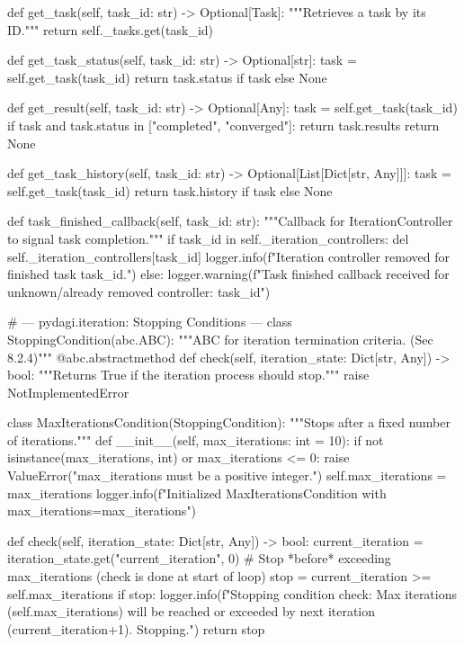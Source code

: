 \documentclass{amsbook}
\theoremstyle{definition}
\theoremstyle{remark}
\numberwithin{equation}{chapter} %
\begin{document}
\begin{python}
    def get_task(self, task_id: str) -> Optional[Task]:
        """Retrieves a task by its ID."""
        return self._tasks.get(task_id)

    def get_task_status(self, task_id: str) -> Optional[str]:
        task = self.get_task(task_id)
        return task.status if task else None

    def get_result(self, task_id: str) -> Optional[Any]:
        task = self.get_task(task_id)
        if task and task.status in ["completed", "converged"]:
            return task.results
        return None

    def get_task_history(self, task_id: str) -> Optional[List[Dict[str, Any]]]:
         task = self.get_task(task_id)
         return task.history if task else None

    def task_finished_callback(self, task_id: str):
         """Callback for IterationController to signal task completion."""
         if task_id in self._iteration_controllers:
              del self._iteration_controllers[task_id]
              logger.info(f"Iteration controller removed for finished task {task_id}.")
         else:
              logger.warning(f"Task finished callback received for unknown/already removed controller: {task_id}")


# --- pydagi.iteration: Stopping Conditions ---
class StoppingCondition(abc.ABC):
    """ABC for iteration termination criteria. (Sec 8.2.4)"""
    @abc.abstractmethod
    def check(self, iteration_state: Dict[str, Any]) -> bool:
        """Returns True if the iteration process should stop."""
        raise NotImplementedError

class MaxIterationsCondition(StoppingCondition):
    """Stops after a fixed number of iterations."""
    def __init__(self, max_iterations: int = 10):
        if not isinstance(max_iterations, int) or max_iterations <= 0:
             raise ValueError("max_iterations must be a positive integer.")
        self.max_iterations = max_iterations
        logger.info(f"Initialized MaxIterationsCondition with max_iterations={max_iterations}")

    def check(self, iteration_state: Dict[str, Any]) -> bool:
        current_iteration = iteration_state.get("current_iteration", 0)
        # Stop *before* exceeding max_iterations (check is done at start of loop)
        stop = current_iteration >= self.max_iterations
        if stop:
             logger.info(f"Stopping condition check: Max iterations ({self.max_iterations}) will be reached or exceeded by next iteration ({current_iteration+1}). Stopping.")
        return stop


\end{python}
\end{document}
